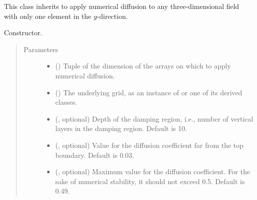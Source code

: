\documentclass[letterpaper,10pt,english]{sphinxmanual}
\begin{document}

\begin{fulllineitems}
\label{\detokenize{api:dycore.diffusion.DiffusionXZ}}
This class inherits {\hyperref[\detokenize{api:dycore.diffusion.Diffusion}]{}} to apply numerical diffusion to any three-dimensional
field with only one element in the \(y\)-direction.

\begin{fulllineitems}
\label{\detokenize{api:dycore.diffusion.DiffusionXZ.__init__}}
Constructor.
\begin{quote}\begin{description}
\item[{Parameters}] \leavevmode\begin{itemize}
\item {} 
 () \textendash{} Tuple of the dimension of the arrays on which to apply numerical diffusion.

\item {} 
 () \textendash{} The underlying grid, as an instance of {\hyperref[\detokenize{api:grids.grid_xyz.GridXYZ}]{}} or one of its derived classes.

\item {} 
 (, optional) \textendash{} Depth of the damping region, i.e., number of vertical layers in the damping region. Default is 10.

\item {} 
 (, optional) \textendash{} Value for the diffusion coefficient far from the top boundary. Default is 0.03.

\item {} 
 (, optional) \textendash{} Maximum value for the diffusion coefficient. For the sake of numerical stability, it should not
exceed 0.5. Default is 0.49.


\end{itemize}
\end{description}
\end{quote}
\end{fulllineitems}
\end{fulllineitems}
\end{document}
